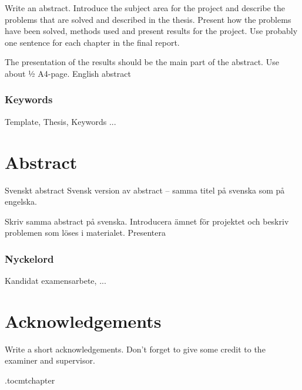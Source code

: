 \vspace{2cm}
Write an abstract. Introduce the subject area for the project and describe the problems that are solved and described in the thesis. Present how the problems have been solved, methods used and present results for the project. Use probably one sentence for each chapter in the final report.

The presentation of the results should be the main part of the abstract. Use about ½ A4-page.
English abstract




\subsection*{Keywords}
Template, Thesis, Keywords ...





\newpage
\thispagestyle{plain}
\chapter*{Abstract}
Svenskt abstract
Svensk version av abstract – samma titel på svenska som på engelska.

Skriv samma abstract på svenska. Introducera ämnet för projektet och beskriv problemen som löses i materialet. Presentera 

\subsection*{Nyckelord}
Kandidat examensarbete, ...


\newpage
\thispagestyle{plain}
\chapter*{Acknowledgements}
Write a short acknowledgements. Don't forget to give some credit to the examiner and supervisor.

\newpage



\newpage

\etocdepthtag.toc{mtchapter}
\thispagestyle{plain}
\tableofcontents

\newpage


